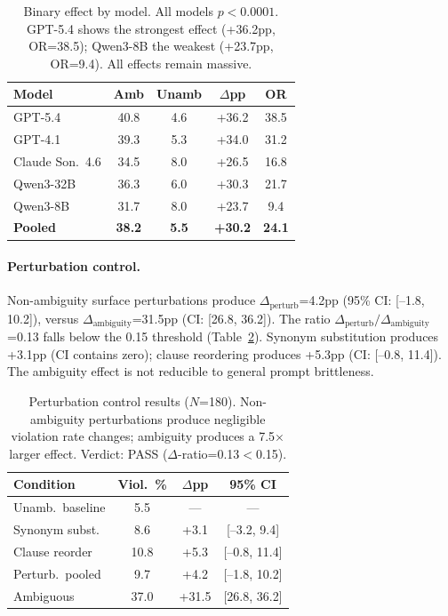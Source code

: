\documentclass[11pt]{article}
\begin{document}
\begin{table}[t]
\centering
\small
\begin{tabular}{lcccc}
\toprule
\textbf{Model} & \textbf{Amb} & \textbf{Unamb} & \textbf{$\Delta$pp} & \textbf{OR} \\
\midrule
GPT-5.4 & 40.8 & 4.6 & +36.2 & 38.5 \\
GPT-4.1 & 39.3 & 5.3 & +34.0 & 31.2 \\
Claude Son.\ 4.6 & 34.5 & 8.0 & +26.5 & 16.8 \\
Qwen3-32B & 36.3 & 6.0 & +30.3 & 21.7 \\
Qwen3-8B & 31.7 & 8.0 & +23.7 & 9.4 \\
\midrule
\textbf{Pooled} & \textbf{38.2} & \textbf{5.5} & \textbf{+30.2} & \textbf{24.1} \\
\bottomrule
\end{tabular}
\caption{Binary effect by model. All models $p<0.0001$. GPT-5.4 shows the strongest effect (+36.2pp, OR=38.5); Qwen3-8B the weakest (+23.7pp, OR=9.4). All effects remain massive.}
\label{tab:binary_model}
\end{table}

\paragraph{Perturbation control.} Non-ambiguity surface perturbations produce $\Delta_{\text{perturb}}$=4.2pp (95\% CI: [--1.8, 10.2]), versus $\Delta_{\text{ambiguity}}$=31.5pp (CI: [26.8, 36.2]). The ratio $\Delta_{\text{perturb}}/\Delta_{\text{ambiguity}}$=0.13 falls below the 0.15 threshold (Table~\ref{tab:perturb}). Synonym substitution produces +3.1pp (CI contains zero); clause reordering produces +5.3pp (CI: [--0.8, 11.4]). The ambiguity effect is not reducible to general prompt brittleness.

\begin{table}[t]
\centering
\small
\begin{tabular}{lccc}
\toprule
\textbf{Condition} & \textbf{Viol.\ \%} & \textbf{$\Delta$pp} & \textbf{95\% CI} \\
\midrule
Unamb.\ baseline & 5.5 & --- & --- \\
Synonym subst. & 8.6 & +3.1 & [--3.2, 9.4] \\
Clause reorder & 10.8 & +5.3 & [--0.8, 11.4] \\
Perturb.\ pooled & 9.7 & +4.2 & [--1.8, 10.2] \\
Ambiguous & 37.0 & +31.5 & [26.8, 36.2] \\
\bottomrule
\end{tabular}
\caption{Perturbation control results ($N$=180). Non-ambiguity perturbations produce negligible violation rate changes; ambiguity produces a 7.5$\times$ larger effect. Verdict: PASS ($\Delta$-ratio=0.13$<$0.15).}
\label{tab:perturb}
\end{table}
\end{document}
